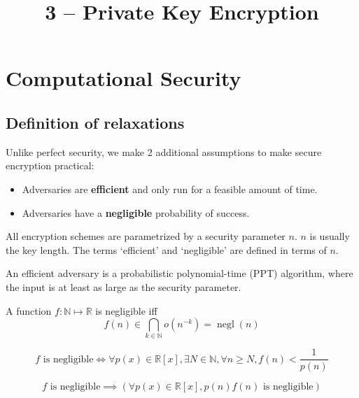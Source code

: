

\title{3 -- Private Key Encryption}

\newcommand*{\PrivKExpt}[2]{\operatorname{PrivK}_{#2}^{\textrm{#1}}}
\newcommand*{\PrivKOut}[2]{\operatorname{PrivKOut}_{#2}^{\textrm{#1}}}



\maketitle
\initMinimal{}

\tableofcontents

\section{Computational Security}

\subsection{Definition of relaxations}

Unlike perfect security, we make 2 additional assumptions to make
secure encryption practical:
\begin{itemize}
\item Adversaries are \textbf{efficient} and only run for a feasible amount of time.
\item Adversaries have a \textbf{negligible} probability of success.
\end{itemize}

All encryption schemes are parametrized by a security parameter $n$.
$n$ is usually the key length.
The terms `efficient' and `negligible' are defined in terms of $n$.

\begin{definition}
An efficient adversary is a probabilistic polynomial-time (PPT) algorithm,
where the input is at least as large as the security parameter.
\end{definition}
\begin{definition}
A function $f:\mathbb{N} \mapsto \mathbb{R}$ is negligible iff
\[ f(n) \in \bigcap_{k \in \mathbb{N}} o(n^{-k}) = \operatorname{negl}(n) \]
\end{definition}

\begin{theorem}
\[ f \textrm{ is negligible} \iff \forall p(x) \in \mathbb{R}[x],
\exists N \in \mathbb{N}, \forall n \ge N, f(n) < \frac{1}{p(n)} \]
\end{theorem}
\begin{theorem}
\[ f \textrm{ is negligible} \implies (\forall p(x) \in \mathbb{R}[x], p(n)f(n) \textrm{ is negligible}) \]
\end{theorem}

